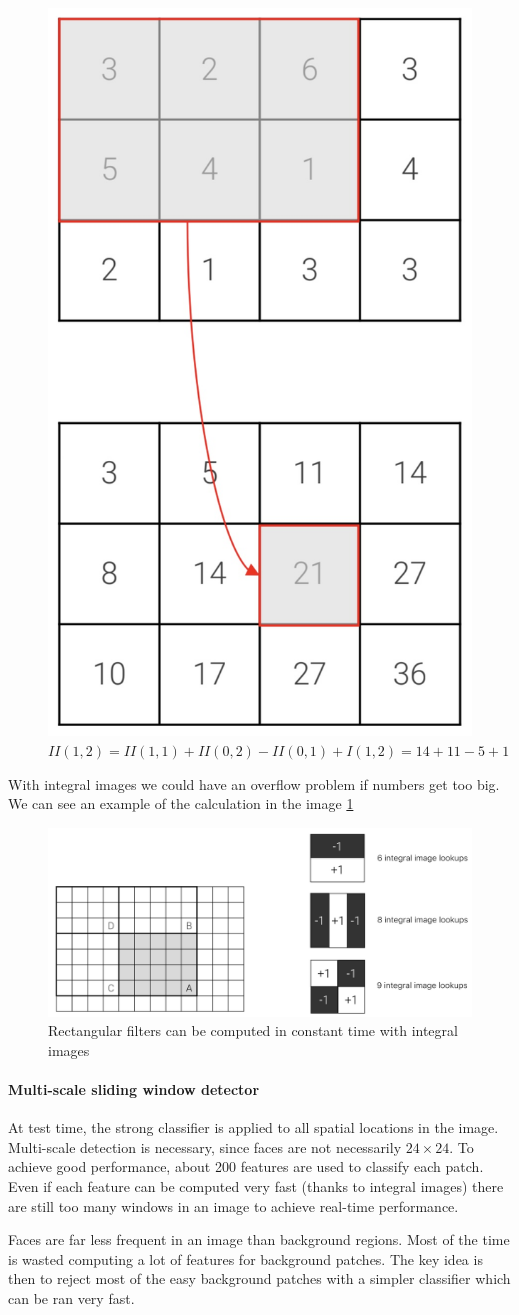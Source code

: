 \begin{figure}[htbp]
  \centering
  \includegraphics[width=0.3\linewidth]{./img/integral_images.jpg}
  \caption{$II(1,2) = II(1,1) + II(0,2) - II(0,1) + I(1,2) = 14 + 11 - 5 + 1$}
  \label{fig:integral_images}
\end{figure}

With integral images we could have an overflow problem if numbers get too big.
We can see an example of the calculation in the image \ref{fig:integral_images}

\begin{figure}[htbp]
  \centering
  \includegraphics[width=0.6\linewidth]{./img/integral_filters.png}
  \caption{Rectangular filters can be computed in constant time with integral images}
\end{figure}

\paragraph{Multi-scale sliding window detector}
At test time, the strong classifier is applied to all spatial locations in the image.
Multi-scale detection is necessary, since faces are not necessarily $24\times 24$.
To achieve good performance, about 200 features are used to classify each patch.
Even if each feature can be computed very fast (thanks to integral images) there are still too many windows in an image to achieve real-time performance.

Faces are far less frequent in an image than background regions.
Most of the time is wasted computing a lot of features for background patches.
The key idea is then to reject most of the easy background patches with a simpler classifier which can be ran very fast.

